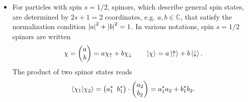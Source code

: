\documentclass[11pt, a4paper]{article}
\newcommand{\ua}{\uparrow}  %
\newcommand{\da}{\downarrow}  %
\begin{document}
\begin{itemize}
    \item For particles with spin $ s = 1/2 $, spinors, which describe general spin states, are determined by $ 2s + 1 = 2 $ coordinates, e.g. $ a, b \in \mathbb{C} $, that satisfy the normalization condition $ \abs{a}^{2} + \abs{b}^{2} = 1 $. In various notations, spin $ s = 1/2 $ spinors are written
	\begin{equation*}
		\chi = 
		\begin{pmatrix}
			a\\
			b
		\end{pmatrix}
		= a \chi_{\ua} + b\chi_{\da} \qquad \ket{\chi} = a \ket{\ua} + b \ket{\da}.
	\end{equation*}
	The product of two spinor states reads
	\begin{equation*}
		\braket{\chi_{1}}{\chi_{2}} = \big(a_{1}^{*} \, \ b_{1}^{*}\big)\cdot 
		\begin{pmatrix}
			a_{2}\\
			b_{2}
		\end{pmatrix}
		= a_{1}^{*}a_{2} + b_{1}^{*}b_{2}.
	\end{equation*}

\end{itemize}
\end{document}
